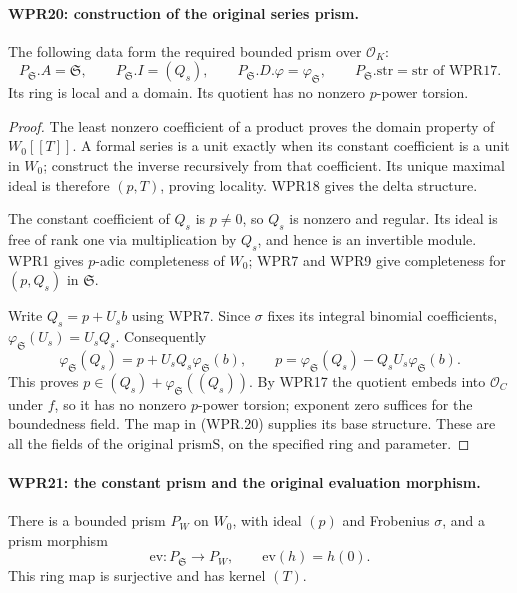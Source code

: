 \paragraph{WPR20: construction of the original series prism.}
\label{claim:WPR20}
The following data form the required bounded prism over
$\mathcal O_K$:
\[
 P_{\mathfrak S}.A=\mathfrak S,
 \qquad P_{\mathfrak S}.I=(Q_s),
 \qquad P_{\mathfrak S}.D.\varphi=\varphi_{\mathfrak S},
 \qquad P_{\mathfrak S}.\mathrm{str}=\mathrm{str}
                     \text{ of WPR17}.                       \tag{WPR.24}
\]
Its ring is local and a domain. Its quotient has no nonzero
$p$-power torsion.

\begin{proof}
The least nonzero coefficient of a product proves the domain
property of $W_0[[T]]$. A formal series is a unit exactly when
its constant coefficient is a unit in $W_0$; construct the
inverse recursively from that coefficient. Its unique maximal
ideal is therefore $(p,T)$, proving locality. WPR18 gives the
delta structure.

The constant coefficient of $Q_s$ is $p\neq0$, so $Q_s$ is
nonzero and regular. Its ideal is free of rank one via
multiplication by $Q_s$, and hence is an invertible module.
WPR1 gives $p$-adic completeness of $W_0$; WPR7 and WPR9
give completeness for $(p,Q_s)$ in $\mathfrak S$.

Write $Q_s=p+U_s b$ using WPR7. Since $\sigma$ fixes its
integral binomial coefficients,
$\varphi_{\mathfrak S}(U_s)=U_sQ_s$. Consequently
\[
 \varphi_{\mathfrak S}(Q_s)
     =p+U_sQ_s\varphi_{\mathfrak S}(b),\qquad
 p=\varphi_{\mathfrak S}(Q_s)
          -Q_sU_s\varphi_{\mathfrak S}(b).
 \tag{WPR.25}
\]
This proves $p\in(Q_s)+\varphi_{\mathfrak S}((Q_s))$.
By WPR17 the quotient embeds into $\mathcal O_C$ under $f$,
so it has no nonzero $p$-power torsion; exponent zero suffices
for the boundedness field. The map in (WPR.20) supplies its
base structure. These are all the fields of the original
$\mathrm{prismS}$, on the specified ring and parameter.
\end{proof}

\paragraph{WPR21: the constant prism and the original evaluation morphism.}
\label{claim:WPR21}
There is a bounded prism $P_W$ on $W_0$, with ideal $(p)$ and
Frobenius $\sigma$, and a prism morphism
\[
 \mathrm{ev}:P_{\mathfrak S}\longrightarrow P_W,
 \qquad \mathrm{ev}(h)=h(0).
 \tag{WPR.26}
\]
This ring map is surjective and has kernel $(T)$.

